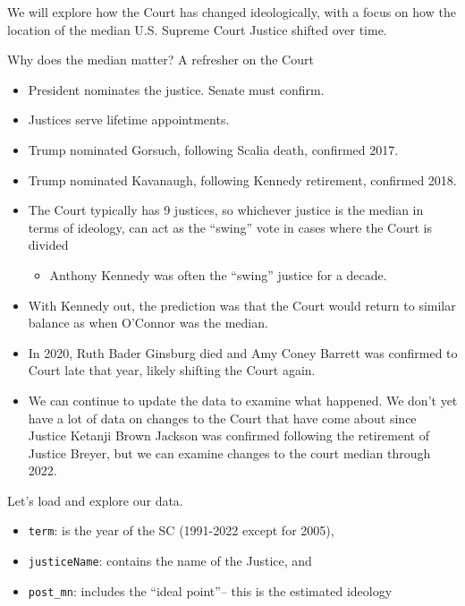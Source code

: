 \documentclass[
  letterpaper,
  DIV=11,
  numbers=noendperiod]{scrreprt}
\providecommand{\tightlist}{%
  \setlength{\itemsep}{0pt}\setlength{\parskip}{0pt}}\usepackage{longtable,booktabs,array}
\begin{document}
We will explore how the Court has changed ideologically, with a focus on
how the location of the median U.S. Supreme Court Justice shifted over
time.

Why does the median matter? A refresher on the Court

\begin{itemize}
\tightlist
\item
  President nominates the justice. Senate must confirm.
\item
  Justices serve lifetime appointments.
\item
  Trump nominated Gorsuch, following Scalia death, confirmed 2017.
\item
  Trump nominated Kavanaugh, following Kennedy retirement, confirmed
  2018.
\item
  The Court typically has 9 justices, so whichever justice is the median
  in terms of ideology, can act as the ``swing'' vote in cases where the
  Court is divided

  \begin{itemize}
  \tightlist
  \item
    Anthony Kennedy was often the ``swing'' justice for a decade.
  \end{itemize}
\item
  With Kennedy out, the prediction was that the Court would return to
  similar balance as when O'Connor was the median.
\item
  In 2020, Ruth Bader Ginsburg died and Amy Coney Barrett was confirmed
  to Court late that year, likely shifting the Court again.
\item
  We can continue to update the data to examine what happened. We don't
  yet have a lot of data on changes to the Court that have come about
  since Justice Ketanji Brown Jackson was confirmed following the
  retirement of Justice Breyer, but we can examine changes to the court
  median through 2022.
\end{itemize}

Let's load and explore our data.

\begin{itemize}
\tightlist
\item
  \texttt{term}: is the year of the SC (1991-2022 except for 2005),
\item
  \texttt{justiceName}: contains the name of the Justice, and\\
\item
  \texttt{post\_mn}: includes the ``ideal point''-- this is the
  estimated ideology
\end{itemize}
\end{document}
